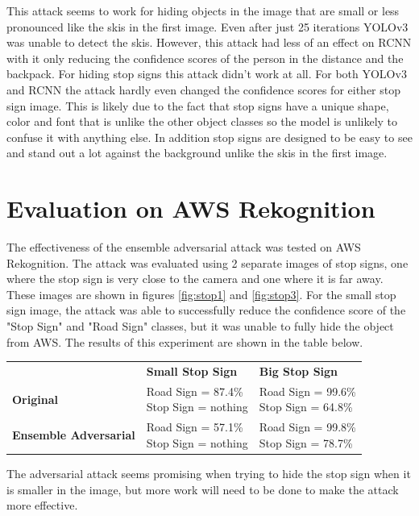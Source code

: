 \documentclass{article}
\begin{document}
This attack seems to work for hiding objects in the image that are small or less pronounced like the skis in the first image. Even after just 25 iterations YOLOv3 was unable to detect the skis. However, this attack had less of an effect on RCNN with it only reducing the confidence scores of the person in the distance and the backpack. For hiding stop signs this attack didn't work at all. For both YOLOv3 and RCNN the attack hardly even changed the confidence scores for either stop sign image. This is likely due to the fact that stop signs have a unique shape, color and font that is unlike the other object classes so the model is unlikely to confuse it with anything else. In addition stop signs are designed to be easy to see and stand out a lot against the background unlike the skis in the first image.

\section{Evaluation on AWS Rekognition}
The effectiveness of the ensemble adversarial attack was tested on AWS Rekognition. The attack was evaluated using 2 separate images of stop signs, one where the stop sign is very close to the camera and one where it is far away. These images are shown in figures \ref{fig:stop1} and \ref{fig:stop3}. For the small stop sign image, the attack was able to successfully reduce the confidence score of the "Stop Sign" and "Road Sign" classes, but it was unable to fully hide the object from AWS. The results of this experiment are shown in the table below.

\begin{center}
\begin{tabular}{l l l}
    & \textbf{Small Stop Sign} & \textbf{Big Stop Sign} \\

    \textbf{Original} & \makecell{Road Sign = 87.4\% \\ Stop Sign = nothing} & \makecell{Road Sign = 99.6\% \\ Stop Sign = 64.8\%} \\

    \textbf{Ensemble Adversarial} & \makecell{Road Sign = 57.1\% \\ Stop Sign = nothing} & \makecell{Road Sign = 99.8\% \\ Stop Sign = 78.7\%} \\
\end{tabular}
\end{center}

The adversarial attack seems promising when trying to hide the stop sign when it is smaller in the image, but more work will need to be done to make the attack more effective.

\clearpage


\end{document}

